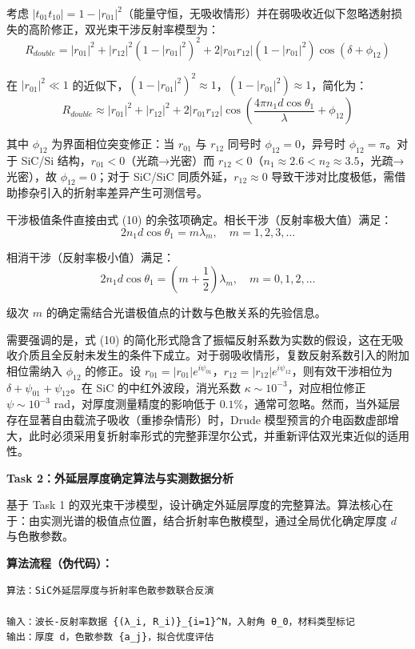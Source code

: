\documentclass{mcmthesis}
\begin{document}
\begin{table}[htbp]
考虑 $|t_{01}t_{10}| = 1 - |r_{01}|^2$（能量守恒，无吸收情形）并在弱吸收近似下忽略透射损失的高阶修正，双光束干涉反射率模型为：
$$R_{double} = |r_{01}|^2 + |r_{12}|^2(1-|r_{01}|^2)^2 + 2|r_{01}r_{12}|(1-|r_{01}|^2)\cos\left(\delta + \phi_{12}\right) \tag{9}$$

在 $|r_{01}|^2 \ll 1$ 的近似下，$(1-|r_{01}|^2)^2 \approx 1$，$(1-|r_{01}|^2) \approx 1$，简化为：
$$R_{double} \approx |r_{01}|^2 + |r_{12}|^2 + 2|r_{01}r_{12}|\cos\left(\frac{4\pi n_1 d\cos\theta_1}{\lambda} + \phi_{12}\right) \tag{10}$$

其中 $\phi_{12}$ 为界面相位突变修正：当 $r_{01}$ 与 $r_{12}$ 同号时 $\phi_{12} = 0$，异号时 $\phi_{12} = \pi$。对于 SiC/Si 结构，$r_{01} < 0$（光疏→光密）而 $r_{12} < 0$（$n_1 \approx 2.6 < n_2 \approx 3.5$，光疏→光密），故 $\phi_{12} = 0$；对于 SiC/SiC 同质外延，$r_{12} \approx 0$ 导致干涉对比度极低，需借助掺杂引入的折射率差异产生可测信号。

干涉极值条件直接由式 (10) 的余弦项确定。相长干涉（反射率极大值）满足：
$$2n_1 d\cos\theta_1 = m\lambda_m, \quad m = 1, 2, 3, \ldots \tag{11}$$

相消干涉（反射率极小值）满足：
$$2n_1 d\cos\theta_1 = \left(m + \frac{1}{2}\right)\lambda_m, \quad m = 0, 1, 2, \ldots \tag{12}$$

级次 $m$ 的确定需结合光谱极值点的计数与色散关系的先验信息。

需要强调的是，式 (10) 的简化形式隐含了振幅反射系数为实数的假设，这在无吸收介质且全反射未发生的条件下成立。对于弱吸收情形，复数反射系数引入的附加相位需纳入 $\phi_{12}$ 的修正。设 $r_{01} = |r_{01}|e^{i\psi_{01}}$，$r_{12} = |r_{12}|e^{i\psi_{12}}$，则有效干涉相位为 $\delta + \psi_{01} + \psi_{12}$。在 SiC 的中红外波段，消光系数 $\kappa \sim 10^{-3}$，对应相位修正 $\psi \sim 10^{-3}$ rad，对厚度测量精度的影响低于 $0.1\%$，通常可忽略。然而，当外延层存在显著自由载流子吸收（重掺杂情形）时，Drude 模型预言的介电函数虚部增大，此时必须采用复折射率形式的完整菲涅尔公式，并重新评估双光束近似的适用性。

\textbf{Task 2：外延层厚度确定算法与实测数据分析}

基于 Task 1 的双光束干涉模型，设计确定外延层厚度的完整算法。算法核心在于：由实测光谱的极值点位置，结合折射率色散模型，通过全局优化确定厚度 $d$ 与色散参数。

\textbf{算法流程（伪代码）：}

\begin{lstlisting}
算法：SiC外延层厚度与折射率色散参数联合反演

输入：波长-反射率数据 {(λ_i, R_i)}_{i=1}^N，入射角 θ_0，材料类型标记
输出：厚度 d，色散参数 {a_j}，拟合优度评估


\end{lstlisting}
\end{table}
\end{document}
